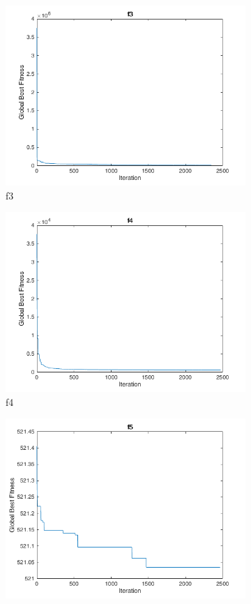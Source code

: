 \begin{figure}
\begin{subfigure}[b]{0.4\textwidth}
    \includegraphics[width=\textwidth]{img/cecrt/f3}
    \caption{f3}
  \end{subfigure}
  \begin{subfigure}[b]{0.4\textwidth}
    \includegraphics[width=\textwidth]{img/cecrt/f4}
    \caption{f4}
  \end{subfigure}
  \begin{subfigure}[b]{0.4\textwidth}
    \includegraphics[width=\textwidth]{img/cecrt/f5}

\end{subfigure}
\end{figure}
